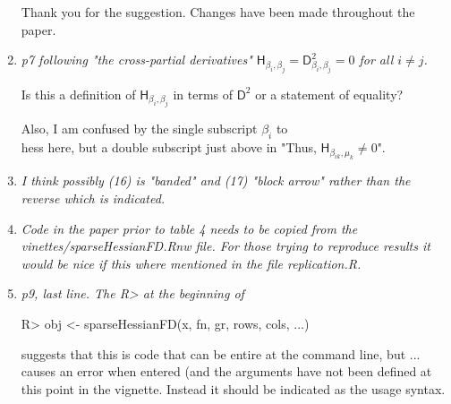 \documentclass{article}
\newcommand{\parD}[3]{\mathsf{D}^{#1}_{#2}#3}
\newcommand{\hess}[2]{\mathsf{H}_{#1}#2}
\newenvironment{revQuote}{\itshape}{\vspace{\baselineskip}}
\newenvironment{response}{\normalfont}{\vspace{\baselineskip}}
\begin{document}
\begin{enumerate}
\begin{response}
  Thank you for the suggestion.  Changes have been made throughout the paper.
\end{response}


\item \begin{revQuote}
p7 following "the cross-partial derivatives"
$\hess{\beta_i,\beta_j}{}=\parD{2}{\beta_i, \beta_j}{}=0$ for all $i\neq
j$.  

  Is this a definition of $\hess{\beta_i,\beta_j}{}$ in terms of  $\parD{2}{}{}$
or a statement of equality?
  
  Also, I am confused by the single subscript $\beta_i$ to \\hess here, but a
double subscript just above in "Thus, $\hess{\beta_{ik},\mu_k}{}\neq 0$".
  \end{revQuote}

\begin{response}
  
\end{response}


\item \begin{revQuote}
 I think possibly (16) is "banded" and (17) "block arrow" rather than the
reverse which is indicated.
  \end{revQuote}

\begin{response}
  
\end{response}


\item \begin{revQuote}
Code in the paper prior to table 4 needs to be copied from the
vinettes/sparseHessianFD.Rnw file. For those trying to reproduce results it
would be nice if this where mentioned in the file replication.R.
  \end{revQuote}

\begin{response}
  
\end{response}


\item \begin{revQuote}
p9, last line. The R> at the beginning of
 
   R> obj <- sparseHessianFD(x, fn, gr, rows, cols, ...)

suggests that this is code that can be entire at the command line, but ...
causes an error when entered (and the arguments have not been defined at
this point in the vignette. Instead it should be indicated as the usage
syntax.
  \end{revQuote}


\end{enumerate}
\end{document}
